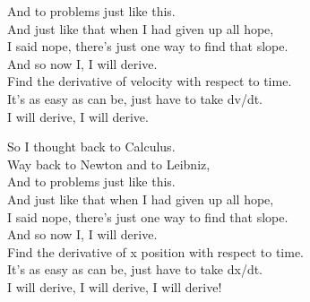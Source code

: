 And to problems just like this.\\
And just like that when I had given up all hope,\\
I said nope, there's just one way to find that slope.\\
And so now I, I will derive.\\
Find the derivative of velocity with respect to time.\\
It's as easy as can be, just have to take dv/dt.\\
I will derive, I will derive.\par
\vspace{10pt}
So I thought back to Calculus.\\
Way back to Newton and to Leibniz,\\
And to problems just like this.\\
And just like that when I had given up all hope,\\
I said nope, there's just one way to find that slope.\\
And so now I, I will derive.\\
Find the derivative of x position with respect to time.\\
It's as easy as can be, just have to take dx/dt.\\
I will derive, I will derive, I will derive!
